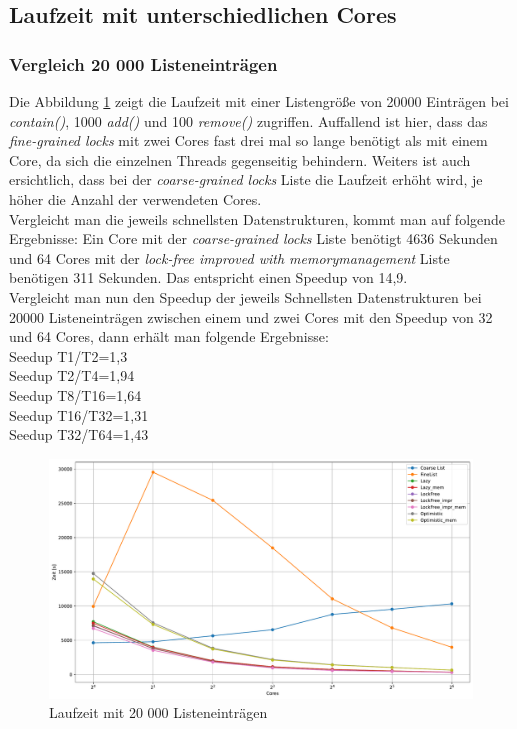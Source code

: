 \subsection{Laufzeit mit unterschiedlichen Cores}
\subsubsection{Vergleich 20 000 Listeneinträgen}
\label{subsec:laufzeit_20000}
Die Abbildung \ref{fig:mixed_time_cores_20000} zeigt die Laufzeit mit einer Listengröße von 20000 Einträgen bei
 \textit{contain()}, 1000 \textit{add()} und 100 \textit{remove()} zugriffen.
 Auffallend ist hier, dass
 das \textit{fine-grained locks} mit zwei Cores fast drei mal so lange benötigt als mit einem Core, da sich die einzelnen
 Threads gegenseitig behindern. 
 Weiters ist auch ersichtlich, dass bei der \textit{coarse-grained locks} Liste die Laufzeit erhöht wird, je höher
 die Anzahl der verwendeten Cores.\\
 Vergleicht man die jeweils schnellsten Datenstrukturen, kommt man auf folgende Ergebnisse:
 Ein Core mit der \textit{coarse-grained locks} Liste benötigt 4636 Sekunden und 64 Cores mit der \textit{lock-free improved with memorymanagement} Liste benötigen 311 Sekunden.
 Das entspricht einen Speedup von 14,9. \\
 Vergleicht man nun den Speedup der jeweils Schnellsten Datenstrukturen bei 20000 Listeneinträgen zwischen einem und zwei Cores mit den Speedup von 32 und 64 Cores, 
 dann erhält man folgende Ergebnisse:
 \\Seedup T1/T2=1,3 
 \\Seedup T2/T4=1,94 
 \\Seedup T8/T16=1,64 
 \\Seedup T16/T32=1,31
 \\Seedup T32/T64=1,43

 \begin{figure}[H]
	\centering
	\includegraphics[width=1.0\linewidth]{./plots_pdf/mixed_time_cores_20000.pdf} 
	\caption{Laufzeit mit 20 000 Listeneinträgen} 
	\label{fig:mixed_time_cores_20000} 
\end{figure}

